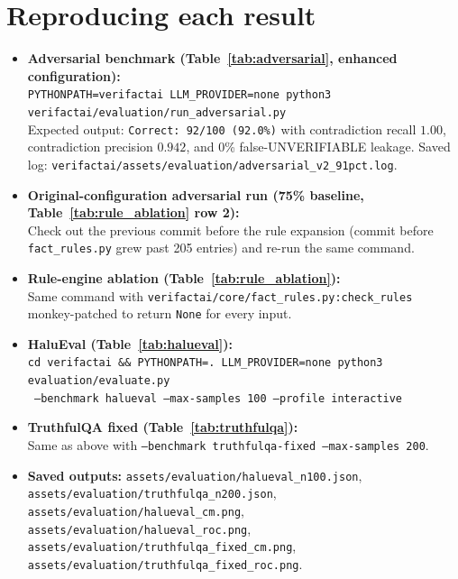 \documentclass[12pt, a4paper, oneside]{report}
\begin{document}
\section{Reproducing each result}
\begin{itemize}[nosep]
    \item \textbf{Adversarial benchmark (Table~\ref{tab:adversarial}, enhanced configuration):}\\
    \texttt{PYTHONPATH=verifactai LLM\_PROVIDER=none python3 verifactai/evaluation/run\_adversarial.py}\\
    Expected output: \texttt{Correct: 92/100 (92.0\%)} with contradiction recall $1.00$, contradiction precision $0.942$, and 0\% false-UNVERIFIABLE leakage. Saved log: \texttt{verifactai/assets/evaluation/adversarial\_v2\_91pct.log}.
    \item \textbf{Original-configuration adversarial run (75\% baseline, Table~\ref{tab:rule_ablation} row 2):}\\
    Check out the previous commit before the rule expansion (commit before \texttt{fact\_rules.py} grew past 205 entries) and re-run the same command.
    \item \textbf{Rule-engine ablation (Table~\ref{tab:rule_ablation}):}\\
    Same command with \texttt{verifactai/core/fact\_rules.py:check\_rules} monkey-patched to return \texttt{None} for every input.
    \item \textbf{HaluEval (Table~\ref{tab:halueval}):}\\
    \texttt{cd verifactai \&\& PYTHONPATH=. LLM\_PROVIDER=none python3 evaluation/evaluate.py}\\
    \texttt{\hphantom{cd verifactai \&\&} --benchmark halueval --max-samples 100 --profile interactive}
    \item \textbf{TruthfulQA fixed (Table~\ref{tab:truthfulqa}):}\\
    Same as above with \texttt{--benchmark truthfulqa-fixed --max-samples 200}.
    \item \textbf{Saved outputs:} \texttt{assets/evaluation/halueval\_n100.json}, \texttt{assets/evaluation/truthfulqa\_n200.json}, \texttt{assets/evaluation/halueval\_cm.png}, \texttt{assets/evaluation/halueval\_roc.png}, \texttt{assets/evaluation/truthfulqa\_fixed\_cm.png}, \texttt{assets/evaluation/truthfulqa\_fixed\_roc.png}.
\end{itemize}
\end{document}
